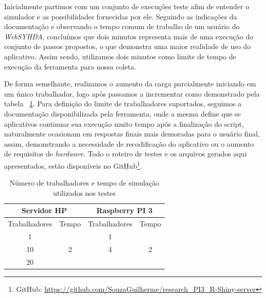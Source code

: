 \documentclass[12pt,english,brazil]{article}
\begin{document}
Inicialmente partimos com um conjunto de execuções teste afim de entender o simulador e as possibilidades fornecidas por ele. Seguindo as indicações da documentação e observando o tempo comum de trabalho de um usuário do \emph{WebSYHDA}, concluímos que %
dois minutos representa mais de uma execução do conjunto de passos propostos, o que demonstra uma maior realidade de uso do aplicativo. Assim sendo, utilizamos dois minutos como limite de tempo de execução da ferramenta para nossa coleta.




De forma semelhante, realizamos o aumento da carga parcialmente iniciando em um único trabalhador, logo após passamos a incrementar como demonstrado pela tabela ~\ref{tab:workers}. Para definição do limite de trabalhadores suportados, seguimos a documentação disponibilizada pela ferramenta, onde a mesma define que se aplicativos continuar sua execução muito tempo após a finalização do script, naturalmente ocasionam em respostas finais mais demoradas para o usuário final, assim, demonstrando a necessidade de recodificação do aplicativo ou o aumento de requisitos de \emph{hardware}. Todo o roteiro de testes e os arquivos gerados aqui apresentados, estão disponíveis no GitHub\footnote{GitHub: \url{https://github.com/SouzaGuilherme/research_PI3_R-Shiny-server}}.

\begin{table}[htbp]
\centering
\caption{Número de trabalhadores e tempo de simulação utilizados nos testes}
\begin{tabular}{c|c|cc}
\hline
\multicolumn{2}{c|}{\textbf{Servidor HP}} & \multicolumn{2}{c}{\textbf{Raspberry PI 3}}             \\ \hline
Trabalhadores     & Tempo                 & \multicolumn{1}{c|}{Trabalhadores} & Tempo              \\ \hline
1                 & \multirow{3}{*}{2}    & \multicolumn{1}{c|}{1}             & \multirow{3}{*}{2} \\ \cline{1-1} \cline{3-3}
10                &                       & \multicolumn{1}{c|}{4}            &                    \\ \cline{1-1} \cline{3-3}
20                &                       & \multicolumn{1}{c|}{}            &                    \\ \hline
\end{tabular}
\label{tab:workers}
\end{table}
\end{document}
